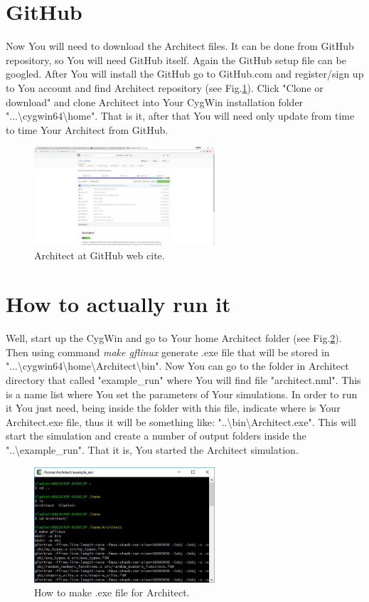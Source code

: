 \documentclass[12pt,a4paper]{article}
\begin{document}
\section{GitHub}
Now You will need to download the Architect files. It can be done from GitHub repository, so You will need GitHub itself. Again the GitHub setup file can be googled. After You will install the GitHub go to GitHub.com and register/sign up to You account and find Architect repository (see Fig.\ref{fig2}). Click "Clone or download" and clone Architect into Your CygWin installation folder "...\textbackslash cygwin64\textbackslash home". That is it, after that You will need only update from time to time Your Architect from GitHub.

\begin{figure}[h]
\centering
\includegraphics[width=0.6\textwidth]{GitHub_web_Architect.jpg}
\caption{Architect at GitHub web cite.}
\label{fig2}
\end{figure}

\section{How to actually run it}

Well, start up the CygWin and go to Your home Architect folder (see Fig.\ref{fig3}). Then using command \textit{make gflinux} generate .exe file that will be stored in "...\textbackslash cygwin64\textbackslash home\textbackslash Architect\textbackslash bin". Now You can go to the folder in Architect directory that called "example\_run" where You will find file "architect.nml". This is a name list where You set the parameters of Your simulations. In order to run it You just need, being inside the folder with this file, indicate where is Your Architect.exe file, thus it will be something like: "..\textbackslash bin\textbackslash Architect.exe". This will start the simulation and create a number of output folders inside the "..\textbackslash example\_run". That it is, You started the Architect simulation.

\begin{figure}[h]
\centering
\includegraphics[width=0.6\textwidth]{CygWin_make_file.jpg}
\caption{How to make .exe file for Architect.}
\label{fig3}
\end{figure}
\end{document}
